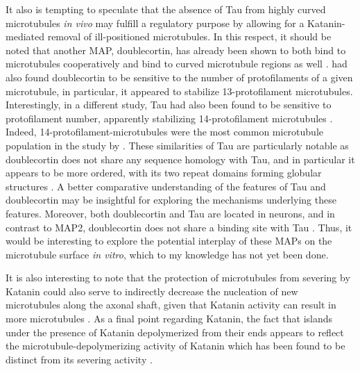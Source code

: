 It also is tempting to speculate that the absence of Tau from highly curved microtubules \textit{in vivo} may fulfill a regulatory purpose by allowing for a Katanin-mediated removal of ill-positioned microtubules. In this respect, it should be noted that another MAP, doublecortin, has already been shown to both bind to microtubules cooperatively and bind to curved microtubule regions as well \parencite{Bechstedt2012, Bechstedt2014}. \cite{Bechstedt2012} had also found doublecortin to be sensitive to the number of protofilaments of a given microtubule, in particular, it appeared to stabilize 13-protofilament microtubules. Interestingly, in a different study, Tau had also been found to be sensitive to protofilament number, apparently stabilizing 14-protofilament microtubules . Indeed, 14-protofilament-microtubules were the most common microtubule population in the study by \cite{Kellogg2018}. These similarities of Tau are particularly notable as doublecortin does not share any sequence homology with Tau, and in particular it appears to be more ordered, with its two repeat domains forming globular structures . A better comparative understanding of the features of Tau and doublecortin may be insightful for exploring the mechanisms underlying these features. Moreover, both doublecortin and Tau are located in neurons, and in contrast to MAP2, doublecortin does not share a binding site with Tau . Thus, it would be interesting to explore the potential interplay of these MAPs on the microtubule surface \textit{in vitro}, which to my knowledge has not yet been done. \par

It is also interesting to note that the protection of microtubules from severing by Katanin could also serve to indirectly decrease the nucleation of new microtubules along the axonal shaft, given that Katanin activity can result in more microtubules . As a final point regarding Katanin, the fact that islands under the presence of Katanin depolymerized from their ends appears to reflect the microtubule-depolymerizing activity of Katanin which has been found to be distinct from its severing activity \parencite{Belonogov2019}.\par

